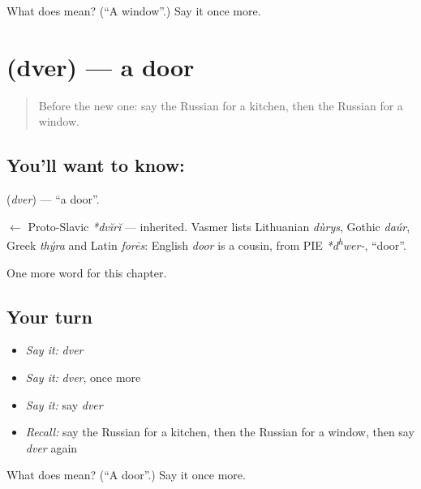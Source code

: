 \begin{tcolorbox}[breakable,colback=teal!4,colframe=teal!35!black,title={Before you move on}]
What does  mean? (\textquotedblleft{}A window\textquotedblright{}.) Say it once more.
\end{tcolorbox}
\section[\texorpdfstring{\ru{дверь} (dver)}{дверь (dver)}]{ (dver) — a door}

\label{lesson:RU-C48-door}



\begin{quote}
Before the new one: say the Russian for a kitchen, then the Russian for a window.
\end{quote}

\subsection*{You'll want to know: }
\textbf{} (\emph{dver}) — \textquotedblleft{}a door\textquotedblright{}.

\begin{cousinweb}
\textbf{} $\leftarrow$ Proto-Slavic \emph{*dvĭrĭ} — inherited. Vasmer lists Lithuanian \emph{dùrys}, Gothic \emph{daúr}, Greek \emph{thýra} and Latin \emph{forēs}: English \emph{door} is a cousin, from PIE \emph{*d\textsuperscript{h}wer-}, \textquotedblleft{}door\textquotedblright{}.
\end{cousinweb}

\begin{grammarlens}[title={What you've built}]
One more word for this chapter.
\end{grammarlens}

\subsection*{Your turn}
\begin{itemize}
\raggedright
  \item \emph{Say it:} \emph{dver}
  \item \emph{Say it:} \emph{dver}, once more
  \item \emph{Say it:} say \emph{dver}
  \item \emph{Recall:} say the Russian for a kitchen, then the Russian for a window, then say \emph{dver} again
\end{itemize}

\begin{tcolorbox}[breakable,colback=teal!4,colframe=teal!35!black,title={Before you move on}]
What does  mean? (\textquotedblleft{}A door\textquotedblright{}.) Say it once more.
\end{tcolorbox}
